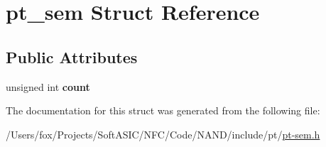 \hypertarget{structpt__sem}{
\section{pt\_\-sem Struct Reference}
\label{structpt__sem}
}
\subsection*{Public Attributes}
\begin{DoxyCompactItemize}
\item 
\hypertarget{structpt__sem_a6f341120f42d5fd9f329ff1119594743}{
unsigned int {\bfseries count}}
\label{structpt__sem_a6f341120f42d5fd9f329ff1119594743}

\end{DoxyCompactItemize}


The documentation for this struct was generated from the following file:\begin{DoxyCompactItemize}
\item 
/Users/fox/Projects/SoftASIC/NFC/Code/NAND/include/pt/\hyperlink{pt-sem_8h}{pt-\/sem.h}\end{DoxyCompactItemize}
